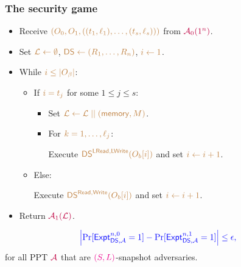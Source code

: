 \documentclass[]{beamer}
\newcommand{\ds}{\mathsf{DS}}
\newcommand{\expt}{\mathsf{Expt}}
\newcommand{\calA}{\mathcal{A}}
\newcommand{\calL}{\mathcal{L}}
\newcommand{\mem}{\mathsf{memory}}
\newcommand{\mr}{\mathsf{Read}}
\newcommand{\mw}{\mathsf{Write}}
\newcommand{\mrl}{\mathsf{LRead}}
\newcommand{\mwl}{\mathsf{LWrite}}
\begin{document}
\begin{frame}
\frametitle{The security game}

\begin{tcolorbox}
\noindent{$\color{magenta}{\mathbf \expt_{\ds,\calA}^{n,\beta}}$}
\begin{itemize}
\color{teal}
    \item Receive $\color{brown}(O_0,O_1,((t_1,\ell_1),\ldots,(t_{s},\ell_{s})))$ from $\color{purple} \calA_0(1^n)$.
    \item Set $\color{brown}\calL\leftarrow\emptyset$, $\color{brown}\ds\leftarrow(R_1,\ldots,R_n)$, $\color{brown}i \leftarrow 1$.
    \item While $\color{brown}i\le|O_\beta|$:
    \begin{itemize}
\color{teal}
        \item If $\color{brown}i = t_j$ for some $1\leq j\leq s$:
        \begin{itemize}
\color{teal}
            \item Set $\color{brown}\calL \leftarrow \calL \mid\mid (\mem, M)$.
            \item For $\color{brown}k=1,\ldots,\ell_j$:

                \quad Execute $\color{brown}\ds^{\mrl,\mwl}(O_b[i])$ and set $\color{brown}i \leftarrow i + 1$.
        \end{itemize}
        \item Else:

            \quad Execute $\color{brown}\ds^{\mr,\mw}(O_b[i])$ and set $\color{brown}i \leftarrow i + 1$.
    \end{itemize}
    \item Return $\color{purple}\calA_1(\calL)$.
\end{itemize}
\end{tcolorbox}
$$
\color{blue}\left|\Pr[\expt_{\ds,\calA}^{n,0}=1] - \Pr[\expt_{\ds,\calA}^{n,1}=1]\right| \le \epsilon,
$$
for all PPT $\color{purple}\calA$ that are $\color{magenta}(S,L)$-snapshot adversaries.
\end{frame}
\end{document}
